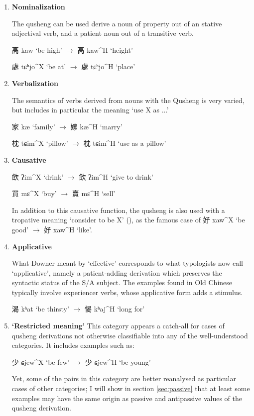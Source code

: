 \documentclass[oldfontcommands,oneside,a4paper,11pt]{article}
\newcommand{\ipa}[1]{{\phon \mbox{#1}}} %
\newcommand{\zh}[1]{{\cn #1}}
\newcommand{\ch}[3]{\zh{#1} \ipa{#2} `#3'}
\begin{document}
\begin{enumerate}
\item \textbf{Nominalization}

The qusheng can be used derive a noun of property out of an stative adjectival verb, and a patient noun out of a transitive verb.

\ch{高}{kaw}{be high} $\rightarrow$ \ch{高}{kaw^H}{height} 

\ch{處}{tɕʰjo^X}{be at} $\rightarrow$ \ch{處}{tɕʰjo^H}{place} 

\item \textbf{Verbalization} 

The semantics of verbs derived from nouns with the Qusheng is very varied, but includes in particular the meaning `use X as ...'

\ch{家}{kæ}{family} $\rightarrow$ \ch{嫁}{kæ^H}{marry} 

\ch{枕}{tɕim^X}{pillow} $\rightarrow$ \ch{枕}{tɕim^H}{use as a pillow} 

\item \textbf{Causative}

\ch{飲}{ʔim^X}{drink} $\rightarrow$ \ch{飲}{ʔim^H}{give to drink} 

\ch{買}{mɛ^X}{buy} $\rightarrow$ \ch{賣}{mɛ^H}{sell} 

In addition to this causative function, the qusheng is also used with a tropative meaning `consider to be X' (\citealt{jacques13tropative}), as the famous case of \ch{好}{xaw^X}{be good} $\rightarrow$ \ch{好}{xaw^H}{like}.

\item \textbf{Applicative} 

What Downer meant by `effective' corresponds to what typologists now call `applicative', namely a patient-adding derivation which preserves the syntactic status of the S/A subject. The examples found in Old Chinese typically involve experiencer verbs, whose applicative form adds a stimulus.

\ch{渴}{kʰat}{be thirsty} $\rightarrow$ \ch{愒}{kʰaj^H}{long for} 

\item \textbf{`Restricted meaning'}
This category appears a catch-all for cases of qusheng derivations not otherwise classifiable into any of the well-understood categories. It includes examples such as:

\ch{少}{ɕjew^X}{be few} $\rightarrow$ \ch{少}{ɕjew^H}{be young} 

Yet, some of the pairs in this category are better reanalysed as particular cases of other categories; I will show in section \ref{sec:passive} that at least some examples may have the same origin as passive and antipassive values of the qusheng derivation.


\end{enumerate}
\end{document}
